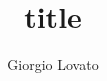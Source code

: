 \documentclass{book}
\title{title}
\author{Giorgio Lovato}
\begin{document}
\fancytitle
\fancytoc




\printbibliography
\end{document}

